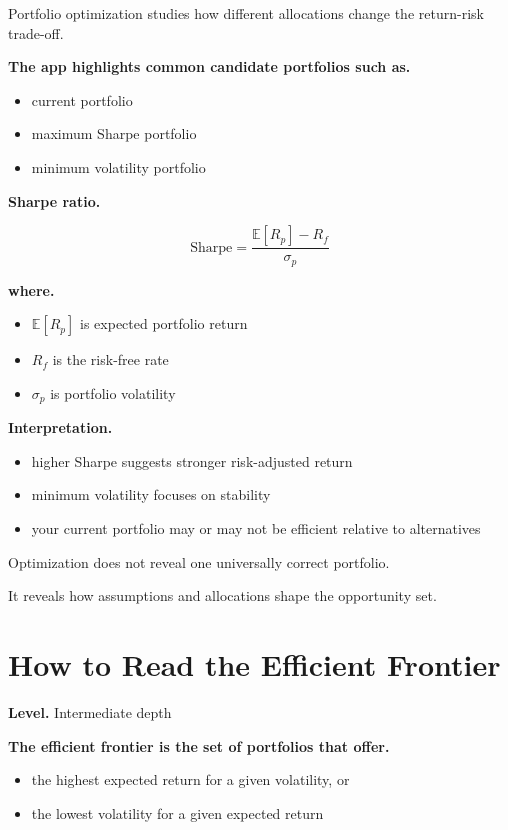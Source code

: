 \documentclass[11pt]{report}
\begin{document}
Portfolio optimization studies how different allocations change the return-risk trade-off.

\textbf{The app highlights common candidate portfolios such as.}

\begin{itemize}
\item current portfolio
\item maximum Sharpe portfolio
\item minimum volatility portfolio
\end{itemize}

\textbf{Sharpe ratio.}

\begin{equation}
\mathrm{Sharpe} = \frac{\mathbb{E}[R_p] - R_f}{\sigma_p}
\end{equation}

\textbf{where.}

\begin{itemize}
\item $\mathbb{E}[R_p]$ is expected portfolio return
\item $R_f$ is the risk-free rate
\item $\sigma_p$ is portfolio volatility
\end{itemize}

\textbf{Interpretation.}

\begin{itemize}
\item higher Sharpe suggests stronger risk-adjusted return
\item minimum volatility focuses on stability
\item your current portfolio may or may not be efficient relative to alternatives
\end{itemize}

Optimization does not reveal one universally correct portfolio.

It reveals how assumptions and allocations shape the opportunity set.

\section{How to Read the Efficient Frontier}
\begin{callout}
\textbf{Level.} Intermediate depth
\end{callout}

\textbf{The efficient frontier is the set of portfolios that offer.}

\begin{itemize}
\item the highest expected return for a given volatility, or
\item the lowest volatility for a given expected return
\end{itemize}
\end{document}
